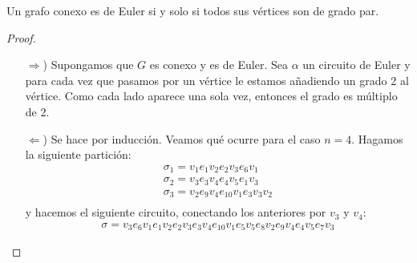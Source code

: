 \begin{teo}
    Un grafo conexo es de Euler si y solo si todos sus vértices son de grado par.
    \begin{proof}\
        \begin{itemize}
            \item[$\Rightarrow$)] Supongamos que $G$ es conexo y es de Euler. Sea $\alpha$ un circuito de Euler y para cada vez que pasamos por un vértice le estamos añadiendo un grado 2 al vértice. Como cada lado aparece una sola vez, entonces el grado es múltiplo de 2.
            \item[$\Leftarrow$)] Se hace por inducción. Veamos qué ocurre para el caso $n=4$. Hagamos la siguiente partición:%
            \begin{align*}
                \sigma_1 = v_1 e_1 v_2 e_2 v_3 e_6 v_1\\
                \sigma_2 = v_3 e_3 v_4 e_4 v_5 e_1 v_3\\
                \sigma_3 = v_2 e_9 v_4 e_{10} v_1 e_3 v_3 v_2\\
            \end{align*}
            y hacemos el siguiente circuito, conectando los anteriores por $v_3$ y $v_4$:
            \begin{align*}
                \sigma = v_3 e_6 v_1 e_1 v_2 e_2 v_3 e_3 v_4 e_{10} v_1 e_5 v_5 e_8 v_2 e_9 v_4 e_4 v_5 e_7 v_3
            \end{align*}
        \end{itemize}
    \end{proof}
\end{teo}

